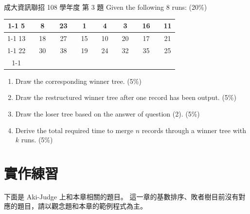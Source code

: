 \begin{pastexam}[label={px:lin-5}]{成大資訊聯招 108 學年度 第 3 題}
Given the following 8 runs: (20\%)
\begin{center}
\setlength{\tabcolsep}{3pt}
\begin{tabular}{|c|c|c|c|c|c|c|c|c|c|c|c|c|c|c|}
\cline{1-1}\cline{3-3}\cline{5-5}\cline{7-7}\cline{9-9}\cline{11-11}\cline{13-13}\cline{15-15}
5 & \multicolumn{1}{c|}{} & 8 & \multicolumn{1}{c|}{} & 23 & \multicolumn{1}{c|}{} & 1 & \multicolumn{1}{c|}{} & 4 & \multicolumn{1}{c|}{} & 3 & \multicolumn{1}{c|}{} & 16 & \multicolumn{1}{c|}{} & 11 \\
\cline{1-1}\cline{3-3}\cline{5-5}\cline{7-7}\cline{9-9}\cline{11-11}\cline{13-13}\cline{15-15}
13 & \multicolumn{1}{c|}{} & 18 & \multicolumn{1}{c|}{} & 27 & \multicolumn{1}{c|}{} & 15 & \multicolumn{1}{c|}{} & 10 & \multicolumn{1}{c|}{} & 20 & \multicolumn{1}{c|}{} & 17 & \multicolumn{1}{c|}{} & 21 \\
\cline{1-1}\cline{3-3}\cline{5-5}\cline{7-7}\cline{9-9}\cline{11-11}\cline{13-13}\cline{15-15}
22 & \multicolumn{1}{c|}{} & 30 & \multicolumn{1}{c|}{} & 38 & \multicolumn{1}{c|}{} & 19 & \multicolumn{1}{c|}{} & 24 & \multicolumn{1}{c|}{} & 32 & \multicolumn{1}{c|}{} & 35 & \multicolumn{1}{c|}{} & 25 \\
\cline{1-1}\cline{3-3}\cline{5-5}\cline{7-7}\cline{9-9}\cline{11-11}\cline{13-13}\cline{15-15}
\end{tabular}
\end{center}
\medskip
\begin{enumerate}[label=(\arabic*)]
\item Draw the corresponding winner tree. (5\%)
\item Draw the restructured winner tree after one record has been output. (5\%)
\item Draw the loser tree based on the answer of question (2). (5\%)
\item Derive the total required time to merge $n$ records through a winner tree with $k$ runs. (5\%)
\end{enumerate}
\end{pastexam}

\section{實作練習}
\label{sec:lin-practice}

下面是 Aki-Judge 上和本章相關的題目。 這一章的基數排序、敗者樹目前沒有對應的題目，請以觀念題和本章的範例程式為主。


